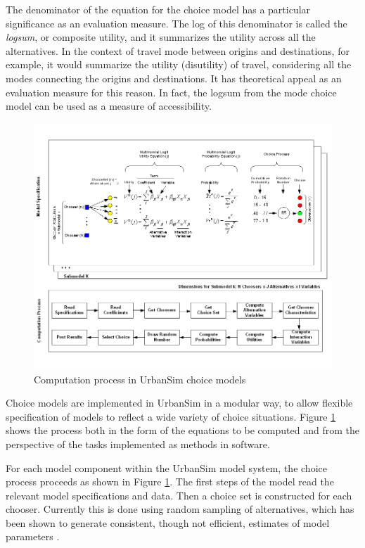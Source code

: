 The denominator of the equation for the choice model has a particular significance as an evaluation measure. The log of this denominator is called the \emph{logsum}, or composite utility, and it summarizes the utility across all the alternatives. In the context of travel mode between origins and destinations, for example, it would summarize the utility (disutility) of travel, considering all the modes connecting the origins and destinations. It has theoretical appeal as an evaluation measure for this reason. In fact, the logsum from the mode choice model can be used as a measure of accessibility.

\begin{figure}[htbp]
    \center
    \includegraphics[width=\textwidth]
    {graphics/ChoiceProcess.png}
    \caption{Computation process in UrbanSim choice models}
    \label{fig:choiceprocess}
\end{figure}

Choice models are implemented in UrbanSim in a modular way, to allow flexible specification of models to reflect a wide variety of choice situations. Figure \ref{fig:choiceprocess} shows the process both in the form of the equations to be computed and from the perspective of the tasks implemented as methods in software.

For each model component within the UrbanSim model system, the choice process proceeds as shown in Figure \ref{fig:choiceprocess}. The first steps of the model read the relevant model specifications and data. Then a choice set is constructed for each chooser. Currently this is done using random sampling of alternatives, which has been shown to generate consistent, though not efficient, estimates of model parameters \citep{ben-akiva-lerman-1987}.

